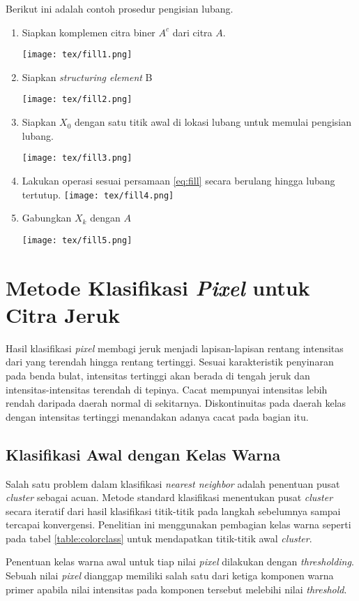 \documentclass[laporan.tex]{subfiles}
\begin{document}
Berikut ini adalah contoh prosedur pengisian lubang.

\begin{enumerate}
\item Siapkan komplemen citra biner $A^c$ dari citra $A$.

\texttt{[image: tex/fill1.png]}
\item Siapkan \emph{structuring element} B

\texttt{[image: tex/fill2.png]}
\item Siapkan $X_0$ dengan satu titik awal di lokasi lubang untuk memulai pengisian lubang.

\texttt{[image: tex/fill3.png]}
\item Lakukan operasi sesuai persamaan \ref{eq:fill} secara berulang hingga lubang tertutup.
\texttt{[image: tex/fill4.png]}
\item Gabungkan $X_k$ dengan $A$

\texttt{[image: tex/fill5.png]}
\end{enumerate}

\section{Metode Klasifikasi \emph{Pixel} untuk Citra Jeruk}

Hasil klasifikasi \emph{pixel} membagi jeruk menjadi lapisan-lapisan rentang intensitas dari yang terendah hingga rentang tertinggi. Sesuai karakteristik penyinaran pada benda bulat, intensitas tertinggi akan berada di tengah jeruk dan intensitas-intensitas terendah di tepinya. Cacat mempunyai intensitas lebih rendah daripada daerah normal di sekitarnya. Diskontinuitas pada daerah kelas dengan intensitas tertinggi menandakan adanya cacat pada bagian itu.\cite{liu}

\subsection{Klasifikasi Awal dengan Kelas Warna}
Salah satu problem dalam klasifikasi \emph{nearest neighbor} adalah penentuan pusat \emph{cluster} sebagai acuan. Metode standard klasifikasi menentukan pusat \emph{cluster} secara iteratif dari hasil klasifikasi titik-titik pada langkah sebelumnya sampai tercapai konvergensi. Penelitian ini menggunakan pembagian kelas warna seperti pada tabel \ref{table:colorclass} untuk mendapatkan titik-titik awal \emph{cluster}.

Penentuan kelas warna awal untuk tiap nilai \emph{pixel} dilakukan dengan \emph{thresholding}. Sebuah nilai \emph{pixel} dianggap memiliki salah satu dari ketiga komponen warna primer apabila nilai intensitas pada komponen tersebut melebihi nilai \emph{threshold}.
\end{document}
